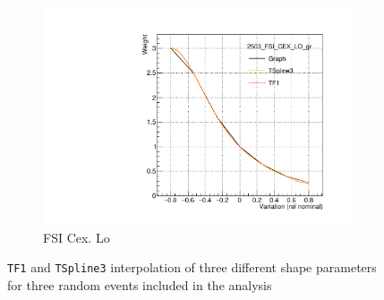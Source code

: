 \begin{figure}[h]
	\begin{subfigure}[t]{0.32\textwidth}
		\includegraphics[width=\textwidth, trim={5mm 5mm 15mm 15mm}, clip,page=1]{figures/niwg/splines/fsi_cex_lo}
		\caption{FSI Cex. Lo}
	\end{subfigure}
\caption{\texttt{TF1} and \texttt{TSpline3} interpolation of three different shape parameters for three random events included in the analysis}
\label{fig:xsec_splines}
\end{figure}

